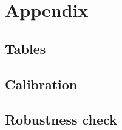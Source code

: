 \documentclass{SelfArx}
\begin{document}
\printbibliography


\appendix
\section{Appendix}
\label{sec:org96b7097}
\label{Ch_super_appen:A}

\subsection{Tables}
\label{sec:org6d10d99}





\subsection{Calibration}
\label{sec:org24f8f59}

\subsection{Robustness check}
\label{sec:org2881278}
\end{document}

